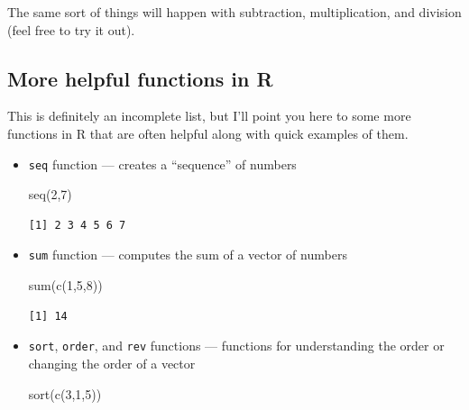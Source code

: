 \documentclass[
  letterpaper,
  DIV=11,
  numbers=noendperiod]{scrreprt}
\newenvironment{Shaded}{\begin{snugshade}}{\end{snugshade}}
\newcommand{\DecValTok}[1]{\textcolor[rgb]{0.68,0.00,0.00}{#1}}
\newcommand{\FunctionTok}[1]{\textcolor[rgb]{0.28,0.35,0.67}{#1}}
\newcommand{\NormalTok}[1]{\textcolor[rgb]{0.00,0.23,0.31}{#1}}
\begin{document}
The same sort of things will happen with subtraction, multiplication,
and division (feel free to try it out).

\subsection{More helpful functions in
R}\label{more-helpful-functions-in-r}

This is definitely an incomplete list, but I'll point you here to some
more functions in R that are often helpful along with quick examples of
them.

\begin{itemize}
\item
  \texttt{seq} function --- creates a ``sequence'' of numbers

\begin{Shaded}
\begin{Highlighting}[]
\FunctionTok{seq}\NormalTok{(}\DecValTok{2}\NormalTok{,}\DecValTok{7}\NormalTok{)}
\end{Highlighting}
\end{Shaded}

\begin{verbatim}
[1] 2 3 4 5 6 7
\end{verbatim}
\item
  \texttt{sum} function --- computes the sum of a vector of numbers

\begin{Shaded}
\begin{Highlighting}[]
\FunctionTok{sum}\NormalTok{(}\FunctionTok{c}\NormalTok{(}\DecValTok{1}\NormalTok{,}\DecValTok{5}\NormalTok{,}\DecValTok{8}\NormalTok{))}
\end{Highlighting}
\end{Shaded}

\begin{verbatim}
[1] 14
\end{verbatim}
\item
  \texttt{sort}, \texttt{order}, and \texttt{rev} functions ---
  functions for understanding the order or changing the order of a
  vector

\begin{Shaded}
\begin{Highlighting}[]
\FunctionTok{sort}\NormalTok{(}\FunctionTok{c}\NormalTok{(}\DecValTok{3}\NormalTok{,}\DecValTok{1}\NormalTok{,}\DecValTok{5}\NormalTok{))}
\end{Highlighting}
\end{Shaded}


\end{itemize}
\end{document}
